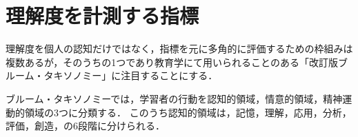 \section{理解度を計測する指標}
理解度を個人の認知だけではなく，指標を元に多角的に評価するための枠組みは複数あるが，そのうちの1つであり教育学にて用いられることのある「改訂版ブルーム・タキソノミー」\cite{bib:anderson}に注目することにする．

ブルーム・タキソノミーでは，学習者の行動を認知的領域，情意的領域，精神運動的領域の3つに分類する．
このうち認知的領域は，記憶，理解，応用，分析，評価，創造，の6段階に分けられる．

